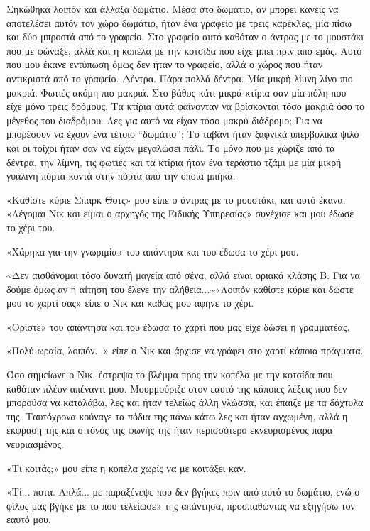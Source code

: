 \documentclass[12pt,twoside, openany]{book}
\begin{document}
Σηκώθηκα λοιπόν και άλλαξα δωμάτιο. Μέσα στο δωμάτιο, αν μπορεί κανείς να αποτελέσει αυτόν τον χώρο δωμάτιο, ήταν ένα γραφείο με τρεις καρέκλες, μία πίσω και δύο μπροστά από το γραφείο. Στο γραφείο αυτό καθόταν ο άντρας με το μουστάκι που με φώναξε, αλλά και η κοπέλα με την κοτσίδα που είχε μπει πριν από εμάς. Αυτό που μου έκανε εντύπωση όμως δεν ήταν το γραφείο, αλλά ο χώρος που ήταν αντικριστά από το γραφείο. Δέντρα. Πάρα πολλά δέντρα. Μία μικρή λίμνη λίγο πιο μακριά. Φωτιές ακόμη πιο μακριά. Στο βάθος κάτι μικρά κτίρια σαν μία πόλη που είχε μόνο τρεις δρόμους. Τα κτίρια αυτά φαίνονταν να βρίσκονται τόσο μακριά όσο το μέγεθος του διαδρόμου. Λες για αυτό να είχαν τόσο μακρύ διάδρομο; Για να μπορέσουν να έχουν ένα τέτοιο “δωμάτιο”; Το ταβάνι ήταν ξαφνικά υπερβολικά ψιλό και οι τοίχοι ήταν σαν να είχαν μεγαλώσει πάλι. Το μόνο που με χώριζε από τα δέντρα, την λίμνη, τις φωτιές και τα κτίρια ήταν ένα τεράστιο τζάμι με μία μικρή γυάλινη πόρτα κοντά στην πόρτα από την οποία μπήκα.

«Καθίστε κύριε Σπαρκ Θοτς» μου είπε ο άντρας με το μουστάκι, και αυτό έκανα. «Λέγομαι Νικ και είμαι ο αρχηγός της Ειδικής Υπηρεσίας» συνέχισε και μου έδωσε το χέρι του.

«Χάρηκα για την γνωριμία» του απάντησα και του έδωσα το χέρι μου.

\textasciitilde Δεν αισθάνομαι τόσο δυνατή μαγεία από σένα, αλλά είναι οριακά κλάσης Β. Για να δούμε όμως αν η αίτηση του έλεγε την αλήθεια...\textasciitilde «Λοιπόν καθίστε κύριε και δώστε μου το χαρτί σας» είπε ο Νικ και καθώς μου άφηνε το χέρι.

«Ορίστε» του απάντησα και του έδωσα το χαρτί που μας είχε δώσει η γραμματέας.

«Πολύ ωραία, λοιπόν...» είπε ο Νικ και άρχισε να γράφει στο χαρτί κάποια πράγματα.

Όσο σημείωνε ο Νικ, έστρεψα το βλέμμα προς την κοπέλα με την κοτσίδα που καθόταν πλέον απέναντι μου. Μουρμούριζε στον εαυτό της κάποιες λέξεις που δεν μπορούσα να καταλάβω, λες και ήταν τελείως άλλη γλώσσα, και έπαιζε με τα δάχτυλα της. Ταυτόχρονα κούναγε τα πόδια της πάνω κάτω λες και ήταν αγχωμένη, αλλά η έκφραση της και ο τόνος της φωνής της ήταν περισσότερο εκνευρισμένος παρά νευριασμένος. 

«Τι κοιτάς;» μου είπε η κοπέλα χωρίς να με κοιτάξει καν.

«Τί... ποτα. Απλά... με παραξένεψε που δεν βγήκες  πριν από αυτό το δωμάτιο, ενώ ο φίλος μας βγήκε με το που τελείωσε» της απάντησα, προσπαθώντας να εξηγήσω τον εαυτό μου.
\end{document}
